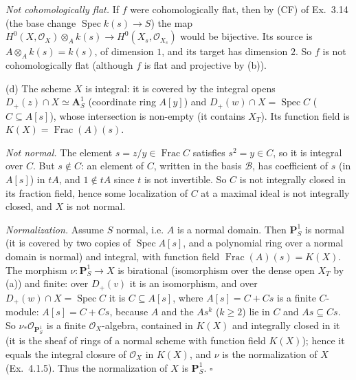 \documentclass[11pt]{article}
\begin{document}
\emph{Not cohomologically flat.} If $f$ were cohomologically flat, then by (CF) of Ex.~3.14 (the base change $\operatorname{Spec}k(s)\to S$) the map $H^0(X,\mathcal O_X)\otimes_Ak(s)\to H^0(X_s,\mathcal O_{X_s})$ would be bijective. Its source is $A\otimes_Ak(s)=k(s)$, of dimension $1$, and its target has dimension $2$. So $f$ is not cohomologically flat (although $f$ is flat and projective by (b)).

(d) The scheme $X$ is integral: it is covered by the integral opens $D_+(z)\cap X\simeq\mathbf A^1_S$ (coordinate ring $A[y]$) and $D_+(w)\cap X=\operatorname{Spec}C$ ($C\subseteq A[s]$), whose intersection is non-empty (it contains $X_T$). Its function field is $K(X)=\operatorname{Frac}(A)(s)$.

\emph{Not normal.} The element $s=z/y\in\operatorname{Frac}C$ satisfies $s^2=y\in C$, so it is integral over $C$. But $s\notin C$: an element of $C$, written in the basis $\mathcal B$, has coefficient of $s$ (in $A[s]$) in $tA$, and $1\notin tA$ since $t$ is not invertible. So $C$ is not integrally closed in its fraction field, hence some localization of $C$ at a maximal ideal is not integrally closed, and $X$ is not normal.

\emph{Normalization.} Assume $S$ normal, i.e. $A$ is a normal domain. Then $\mathbf P^1_S$ is normal (it is covered by two copies of $\operatorname{Spec}A[s]$, and a polynomial ring over a normal domain is normal) and integral, with function field $\operatorname{Frac}(A)(s)=K(X)$. The morphism $\nu:\mathbf P^1_S\to X$ is birational (isomorphism over the dense open $X_T$ by (a)) and finite: over $D_+(v)$ it is an isomorphism, and over $D_+(w)\cap X=\operatorname{Spec}C$ it is $C\subseteq A[s]$, where $A[s]=C+Cs$ is a finite $C$-module: $A[s]=C+Cs$, because $A$ and the $As^k$ ($k\ge2$) lie in $C$ and $As\subseteq Cs$. So $\nu_*\mathcal O_{\mathbf P^1_S}$ is a finite $\mathcal O_X$-algebra, contained in $K(X)$ and integrally closed in it (it is the sheaf of rings of a normal scheme with function field $K(X)$); hence it equals the integral closure of $\mathcal O_X$ in $K(X)$, and $\nu$ is the normalization of $X$ (Ex.~4.1.5). Thus the normalization of $X$ is $\mathbf P^1_S$. \hfill$\square$
\end{document}
